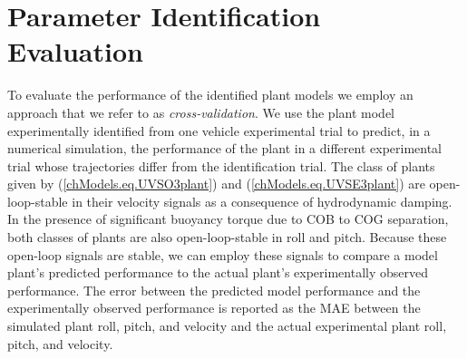 \section{Parameter Identification Evaluation}
\label{appenJHUHTF.sec.paramEvalMethod}

To evaluate the performance of the identified plant models we employ
an approach that we refer to as {\it cross-validation}.  
% 
We use the plant model experimentally identified from one vehicle
experimental trial to predict, in a numerical simulation, the
performance of the plant in a different experimental trial
whose trajectories differ from the identification trial.
%
The class of plants given by (\ref{chModels.eq.UVSO3plant}) and
(\ref{chModels.eq.UVSE3plant}) are open-loop-stable in their velocity
signals as a consequence of hydrodynamic damping. 
%
In the presence of significant buoyancy torque due to
\ac{COB} to \ac{COG} separation, both classes of
plants are also open-loop-stable in roll and pitch.
%
Because these open-loop signals are stable, we can employ these
signals to compare a model plant's predicted performance to the
actual plant's experimentally observed performance.
% 
The error between the predicted model performance and the
experimentally observed performance is reported as the \ac{MAE}
between the simulated plant roll, pitch, and velocity and the actual
experimental plant roll, pitch, and velocity.


